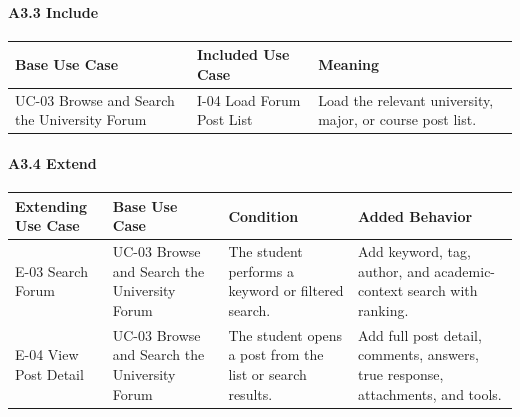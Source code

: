 \documentclass[12pt]{article}
\renewcommand{\baselinestretch}{1.5}
\begin{document}
\hypertarget{sec:a3-3-include}{}
\paragraph*{A3.3 Include}
\par\medskip

\begingroup
\small
\renewcommand{\baselinestretch}{1.0}\selectfont
\renewcommand{\arraystretch}{1.15}
\setlength{\tabcolsep}{6pt}
\begin{longtable}{|>{\raggedright\arraybackslash}p{}|>{\raggedright\arraybackslash}p{}|>{\raggedright\arraybackslash}p{}|}
\hline
\textbf{Base Use Case} & \textbf{Included Use Case} & \textbf{Meaning} \\ \hline
\endhead
UC-03 Browse and Search the University Forum & I-04 Load Forum Post List & Load the relevant university, major, or course post list. \\ \hline
\end{longtable}
\endgroup
\par\medskip

\hypertarget{sec:a3-4-extend}{}
\paragraph*{A3.4 Extend}
\par\medskip

\begingroup
\small
\renewcommand{\baselinestretch}{1.0}\selectfont
\renewcommand{\arraystretch}{1.15}
\setlength{\tabcolsep}{6pt}
\begin{longtable}{|>{\raggedright\arraybackslash}p{}|>{\raggedright\arraybackslash}p{}|>{\raggedright\arraybackslash}p{}|>{\raggedright\arraybackslash}p{}|}
\hline
\textbf{Extending Use Case} & \textbf{Base Use Case} & \textbf{Condition} & \textbf{Added Behavior} \\ \hline
\endhead
E-03 Search Forum & UC-03 Browse and Search the University Forum & The student performs a keyword or filtered search. & Add keyword, tag, author, and academic-context search with ranking. \\ \hline
E-04 View Post Detail & UC-03 Browse and Search the University Forum & The student opens a post from the list or search results. & Add full post detail, comments, answers, true response, attachments, and tools. \\ \hline
\end{longtable}
\endgroup
\par\medskip
\end{document}
